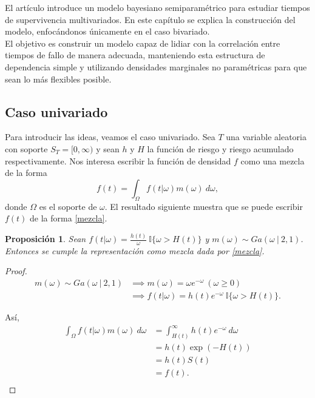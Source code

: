\documentclass[11pt,a4paper]{article}
\newtheorem{proposition}{Proposición}[subsection]
\begin{document}
El artículo \citet{nieto} introduce un modelo bayesiano semiparamétrico para estudiar tiempos de supervivencia multivariados. En este capítulo se explica la construcción del modelo, enfocándonos únicamente en el caso bivariado.\\

El objetivo es construir un modelo capaz de lidiar con la correlación entre tiempos de fallo de manera adecuada, manteniendo esta estructura de dependencia simple y utilizando densidades marginales no paramétricas para que sean lo más flexibles posible.\\

\subsection{Caso univariado}

Para introducir las ideas, veamos el caso univariado. Sea $T$ una variable aleatoria con soporte $S_T = [0, \infty)$ y sean $h$ y $H$ la función de riesgo y riesgo acumulado respectivamente. Nos interesa escribir la función de densidad $f$ como una mezcla de la forma
\begin{equation} \label{mezcla}
f(t) = \int_\Omega f(t|\omega)m(\omega) \ d\omega,
\end{equation}
donde $\Omega$ es el soporte de $\omega$. El resultado siguiente muestra que se puede escribir $f(t)$ de la forma \eqref{mezcla}.

\begin{proposition}
Sean $f(t|\omega) = \frac{h(t)}{\omega} \ \mathbb{I}\lbrace\omega > H(t)\rbrace$ y $m(\omega)\sim Ga(\omega \ | \ 2, 1)$. Entonces se cumple la representación como mezcla dada por \eqref{mezcla}.
\end{proposition}

\begin{proof}
\begin{align*}
m(\omega) \sim Ga(\omega \ | \ 2, 1) &\implies m(\omega) = \omega e^{-\omega} \ (\omega\geq 0)\\
&\implies f(t|\omega) = h(t)e^{-\omega} \ \mathbb{I}\lbrace\omega > H(t)\rbrace.
\end{align*}

Así,
\begin{align*}
\int_\Omega f(t|\omega)m(\omega) \ d\omega &= \int_{H(t)}^\infty h(t)e^{-\omega} \ d\omega\\
&= h(t) \exp(-H(t))\\
&= h(t)S(t)\\
&= f(t).\\
\end{align*}
\end{proof}
\end{document}

